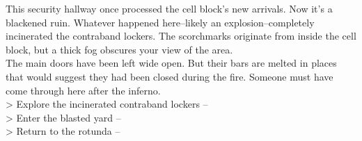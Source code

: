 This security hallway once processed the cell block’s new arrivals. Now it’s a blackened ruin. Whatever happened here--likely an explosion--completely incinerated the contraband lockers. The scorchmarks originate from inside the cell block, but a thick fog obscures your view of the area.\\

The main doors have been left wide open. But their bars are melted in places that would suggest they had been closed during the fire. Someone must have come through here after the inferno.\\

> Explore the incinerated contraband lockers -- \\
> Enter the blasted yard -- \\
> Return to the rotunda -- 